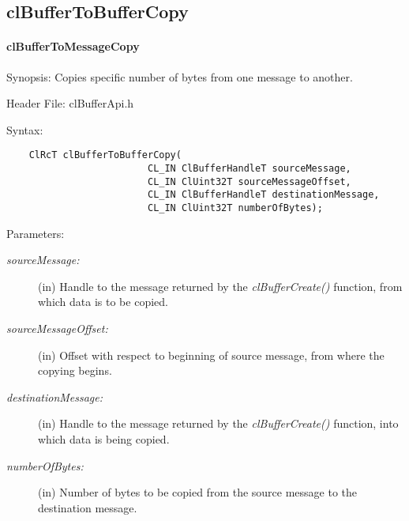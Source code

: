\subsection{clBufferToBufferCopy}
\hypertarget{pagebuf126}{}\paragraph{cl\-Buffer\-To\-Message\-Copy}\label{pagebuf126}
\begin{Desc}
\item[Synopsis:]Copies specific number of bytes from one message to another.\end{Desc}
\begin{Desc}
\item[Header File:]clBufferApi.h\end{Desc}
\begin{Desc}
\item[Syntax:]

\footnotesize\begin{verbatim}    ClRcT clBufferToBufferCopy(
                         CL_IN ClBufferHandleT sourceMessage,
                         CL_IN ClUint32T sourceMessageOffset,
                         CL_IN ClBufferHandleT destinationMessage,
                         CL_IN ClUint32T numberOfBytes);
\end{verbatim}
\normalsize
\end{Desc}
\begin{Desc}
\item[Parameters:]
\begin{description}
\item[{\em source\-Message:}](in) Handle to the message returned by the \textit{clBufferCreate()} function, from which data is to be copied. 
\item[{\em source\-Message\-Offset:}](in) Offset with respect to beginning of source message, from where the copying begins. 
\item[{\em destination\-Message:}](in) Handle to the message returned by the \textit{clBufferCreate()} function, into which data is being copied.
\item[{\em number\-Of\-Bytes:}](in) Number of bytes to be copied from the source message to the destination message.\end{description}
\end{Desc}

